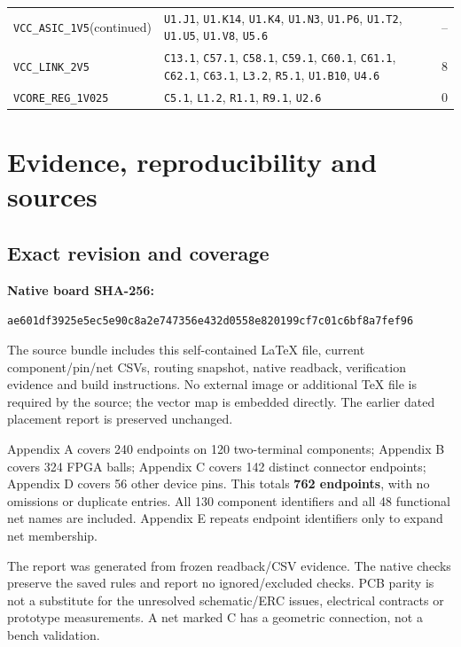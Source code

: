 \documentclass[11pt,a4paper]{article}
\begin{document}
\begin{longtable}{@{}P{48mm}P{109mm}P{10mm}@{}}
\nolinkurl{VCC_ASIC_1V5}\newline (continued) & \nolinkurl{U1.J1}, \nolinkurl{U1.K14}, \nolinkurl{U1.K4}, \nolinkurl{U1.N3}, \nolinkurl{U1.P6}, \nolinkurl{U1.T2}, \nolinkurl{U1.U5}, \nolinkurl{U1.V8}, \nolinkurl{U5.6} & -- \\
\nolinkurl{VCC_LINK_2V5} & \nolinkurl{C13.1}, \nolinkurl{C57.1}, \nolinkurl{C58.1}, \nolinkurl{C59.1}, \nolinkurl{C60.1}, \nolinkurl{C61.1}, \nolinkurl{C62.1}, \nolinkurl{C63.1}, \nolinkurl{L3.2}, \nolinkurl{R5.1}, \nolinkurl{U1.B10}, \nolinkurl{U4.6} & 8 \\
\nolinkurl{VCORE_REG_1V025} & \nolinkurl{C5.1}, \nolinkurl{L1.2}, \nolinkurl{R1.1}, \nolinkurl{R9.1}, \nolinkurl{U2.6} & 0 \\
\end{longtable}\endgroup

\clearpage\section{Evidence, reproducibility and sources}
\subsection{Exact revision and coverage}
\textbf{Native board SHA-256:}\par
\nolinkurl{ae601df3925e5ec5e90c8a2e747356e432d0558e820199cf7c01c6bf8a7fef96}

The source bundle includes this self-contained LaTeX file, current component/pin/net CSVs, routing snapshot, native readback, verification evidence and build instructions. No external image or additional TeX file is required by the source; the vector map is embedded directly. The earlier dated placement report is preserved unchanged.

Appendix A covers 240 endpoints on 120 two-terminal components; Appendix B covers 324 FPGA balls; Appendix C covers 142 distinct connector endpoints; Appendix D covers 56 other device pins. This totals \textbf{762 endpoints}, with no omissions or duplicate entries. All 130 component identifiers and all 48 functional net names are included. Appendix E repeats endpoint identifiers only to expand net membership.

The report was generated from frozen readback/CSV evidence. The native checks preserve the saved rules and report no ignored/excluded checks. PCB parity is not a substitute for the unresolved schematic/ERC issues, electrical contracts or prototype measurements. A net marked C has a geometric connection, not a bench validation.
\end{document}

